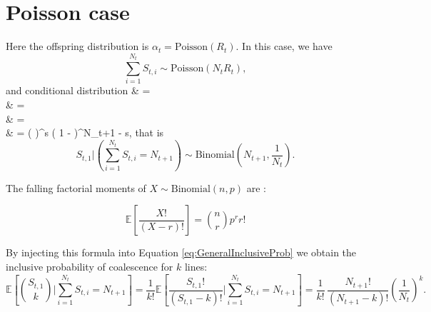 \documentclass{article}
\let\oldalign\align
\let\oldendalign\endalign
\renewenvironment{align}{\linenomathNonumbers\oldalign}{\oldendalign\endlinenomath}
\begin{document}
\section{Poisson case}

Here the offspring distribution is $\alpha_t = \text{Poisson}(R_t)$.
In this case, we have 
	\begin{equation}
		\sum_{i=1}^{N_t} S_{t,i} \sim \text{Poisson}(N_t R_t),
	\end{equation}
and conditional distribution
{\allowdisplaybreaks
	\begin{align}
		\bigg[S_{t,1} = s \bigg| \sum_{i=1}^{N_t} S_{t,i} = N_{t+1} \bigg]
			& =  \nonumber\\
			& =  \nonumber\\
			& =  \nonumber\\
			& =  \left(  \right)^s \left( 1 -  \right)^{N_{t+1} - s}, 
	\end{align}
}
that is
	\begin{equation}
		S_{t,1} \bigg| \left(\sum_{i=1}^{N_t} S_{t,i} = N_{t+1}\right) \sim \text{Binomial}\left(N_{t+1}, \frac{1}{N_t}\right).
	\end{equation}

The falling factorial moments of $X \sim \mathrm{Binomial}(n,p)$ are
\citep{Potts1953}:

\begin{equation}
	\mathbb{E}\left[\frac{X!}{(X-r)!}\right]=\binom{n}{r} p^r r!
\end{equation}

By injecting this formula into Equation \eqref{eq:GeneralInclusiveProb} 
we obtain the inclusive probability of coalescence for $k$ lines:
\begin{equation}
	\mathbb{E} \left[ \binom{S_{t,1}}{k} \bigg| \sum_{i=1}^{N_t} S_{t,i} = N_{t+1} \right]
		= \frac{1}{k!} \mathbb{E} \left[ \frac{S_{t,1}!}{(S_{t,1} - k)!} \bigg| \sum_{i=1}^{N_t} S_{t,i} = N_{t+1} \right]
		= \frac{1}{k!} \, \frac{N_{t+1}!}{(N_{t+1} - k)!} \left( \frac{1}{N_t} \right)^k.
\end{equation}
\end{document}
